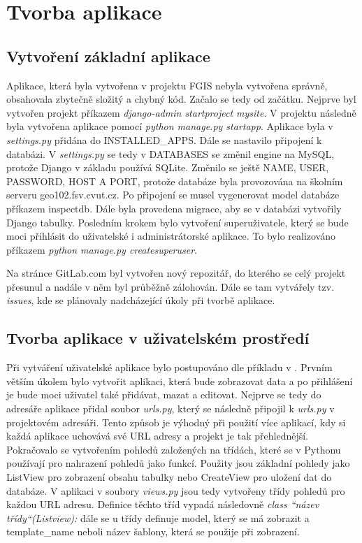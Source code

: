 \chapter{Tvorba aplikace}
\label{4-tvorba-aplikace}

\section{Vytvoření základní aplikace}

Aplikace, která byla vytvořena v projektu FGIS nebyla vytvořena
správně, obsahovala zbytečně složitý a chybný kód. Začalo se tedy
od začátku. Nejprve byl vytvořen projekt příkazem \emph{django-admin
  startproject mysite}. V projektu následně byla vytvořena aplikace
pomocí \emph{python manage.py startapp}. Aplikace byla v
\emph{settings.py} přidána do INSTALLED\_APPS. Dále se
nastavilo připojení k databázi. V \emph{settings.py} se tedy v
DATABASES se změnil engine na MySQL, protože Django v základu
používá SQLite. Změnilo se ještě NAME, USER, PASSWORD, HOST A PORT,
protože databáze byla provozována na školním serveru
geo102.fsv.cvut.cz. Po připojení se musel vygenerovat model databáze
příkazem inspectdb. Dále byla
provedena migrace, aby se v databázi vytvořily Django
tabulky. Posledním krokem bylo vytvoření superuživatele, který se bude
moci přihlásit do uživatelské i administrátorské aplikace. To bylo
realizováno příkazem \emph{python manage.py createsuperuser}.

Na stránce GitLab.com byl vytvořen nový repozitář, do kterého se celý
projekt přesunul a nadále v něm byl průběžně zálohován. Dále se tam
vytvářely tzv. \emph{issues}, kde se plánovaly nadcházející úkoly při
tvorbě aplikace.

\section{Tvorba aplikace v uživatelském prostředí}
Při vytváření uživatelské aplikace bylo postupováno dle příkladu v \cite{django-for-beginners}.
Prvním větším úkolem bylo vytvořit aplikaci, která bude zobrazovat
data a po přihlášení je bude moci uživatel také přidávat, mazat a
editovat. Nejprve se tedy do adresáře aplikace přidal soubor \emph{urls.py},
který se následně připojil k \emph{urls.py} v projektovém adresáři. Tento
způsob je výhodný při použití více aplikací, kdy si každá aplikace
uchovává své URL adresy a projekt je tak přehlednější. Pokračovalo se
vytvořením pohledů založených na třídách, které se v Pythonu používají
pro nahrazení pohledů jako funkcí. Použity jsou základní pohledy jako
ListView pro zobrazení obsahu tabulky nebo CreateView pro uložení dat
do databáze. V aplikaci v soubory \emph{views.py} jsou tedy vytvořeny
třídy pohledů pro každou URL adresu. Definice těchto tříd vypadá
následovně \emph{class “název třídy“(Listview):} dále se u třídy
definuje model, který se má zobrazit a template\_name neboli název
šablony, která se použije při zobrazení.

